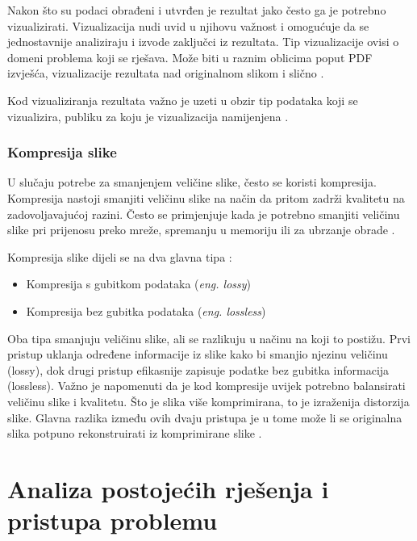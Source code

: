 \documentclass{foi}
\begin{document}
Nakon što su podaci obrađeni i utvrđen je rezultat jako često ga je potrebno vizualizirati. Vizualizacija nudi uvid u njihovu važnost i omogućuje da se jednostavnije analiziraju i izvode zaključci iz rezultata. 
Tip vizualizacije ovisi o domeni problema koji se rješava. Može biti u raznim oblicima poput PDF izvješća, vizualizacije rezultata nad originalnom slikom i slično  \cite{Visulization}.

Kod vizualiziranja rezultata važno je uzeti u obzir tip podataka koji se vizualizira, publiku za koju je vizualizacija namijenjena \cite{Visulization}. 

\subsubsection{Kompresija slike}

U slučaju potrebe za smanjenjem veličine slike, često se koristi kompresija. Kompresija nastoji smanjiti veličinu slike na način da pritom zadrži kvalitetu na zadovoljavajućoj razini. Često se primjenjuje kada je potrebno smanjiti veličinu slike pri prijenosu preko mreže, spremanju u memoriju ili za ubrzanje obrade \cite{ImageProcessing}.

\begin{flushleft}
Kompresija slike dijeli se na dva glavna tipa \cite{Compression}:
\begin{itemize}
    \item Kompresija s gubitkom podataka (\textit{eng. lossy})
    \item Kompresija bez gubitka podataka (\textit{eng. lossless})
\end{itemize}
\end{flushleft}

Oba tipa smanjuju veličinu slike, ali se razlikuju u načinu na koji to postižu.  
Prvi pristup uklanja određene informacije iz slike kako bi smanjio njezinu veličinu (lossy), dok drugi pristup efikasnije zapisuje podatke bez gubitka informacija (lossless).  
Važno je napomenuti da je kod kompresije uvijek potrebno balansirati veličinu slike i kvalitetu. Što je slika više komprimirana, to je izraženija distorzija slike.  
Glavna razlika između ovih dvaju pristupa je u tome može li se originalna slika potpuno rekonstruirati iz komprimirane slike \cite{Compression}.

\pagebreak


\section{Analiza postojećih rješenja i pristupa problemu}
\end{document}

